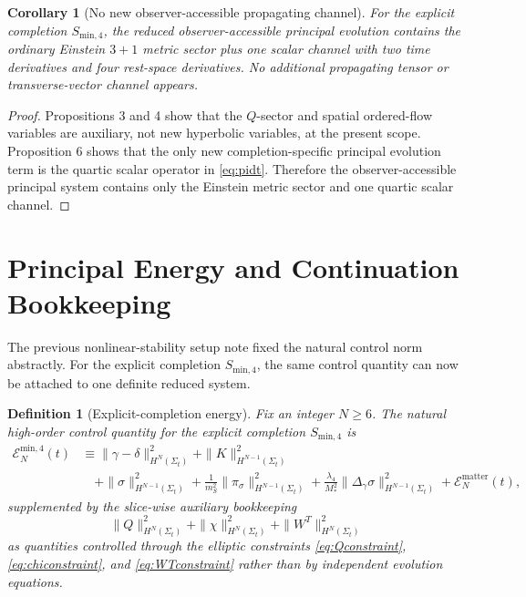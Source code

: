 \documentclass[11pt]{article}
\newtheorem{definition}{Definition}
\newtheorem{corollary}{Corollary}
\begin{document}
\begin{corollary}[No new observer-accessible propagating channel]
For the explicit completion \(S_{\mathrm{min},4}\), the reduced observer-accessible principal evolution contains the ordinary Einstein \(3+1\) metric sector plus one scalar channel with two time derivatives and four rest-space derivatives. No additional propagating tensor or transverse-vector channel appears.
\end{corollary}

\begin{proof}
Propositions 3 and 4 show that the \(Q\)-sector and spatial ordered-flow variables are auxiliary, not new hyperbolic variables, at the present scope. Proposition 6 shows that the only new completion-specific principal evolution term is the quartic scalar operator in \eqref{eq:pidt}. Therefore the observer-accessible principal system contains only the Einstein metric sector and one quartic scalar channel.
\end{proof}

\section{Principal Energy and Continuation Bookkeeping}

The previous nonlinear-stability setup note fixed the natural control norm abstractly. For the explicit completion \(S_{\mathrm{min},4}\), the same control quantity can now be attached to one definite reduced system.

\begin{definition}[Explicit-completion energy]
Fix an integer \(N\ge 6\). The natural high-order control quantity for the explicit completion \(S_{\mathrm{min},4}\) is
\begin{align}
\mathcal E_N^{\mathrm{min},4}(t)
&\equiv
\|\gamma-\delta\|_{H^N(\Sigma_t)}^2
+\|K\|_{H^{N-1}(\Sigma_t)}^2
\nonumber\\
&\quad
+\|\sigma\|_{H^{N-1}(\Sigma_t)}^2
+\frac{1}{m_S^2}\|\pi_\sigma\|_{H^{N-1}(\Sigma_t)}^2
+\frac{\lambda_4}{M_*^2}\|\Delta_\gamma \sigma\|_{H^{N-1}(\Sigma_t)}^2
+\mathcal E_N^{\mathrm{matter}}(t),
\label{eq:ENmin}
\end{align}
supplemented by the slice-wise auxiliary bookkeeping
\begin{equation}
\|Q\|_{H^N(\Sigma_t)}^2
+\|\chi\|_{H^N(\Sigma_t)}^2
+\|W^T\|_{H^N(\Sigma_t)}^2
\label{eq:auxbookkeeping}
\end{equation}
as quantities controlled through the elliptic constraints \eqref{eq:Qconstraint}, \eqref{eq:chiconstraint}, and \eqref{eq:WTconstraint} rather than by independent evolution equations.
\end{definition}
\end{document}
